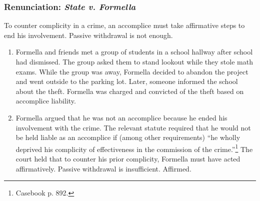 \subsubsection{Renunciation: \emph{State v. Formella}}

To counter complicity in a crime, an accomplice must take affirmative steps to 
end his involvement. Passive withdrawal is not enough.

\begin{enumerate}
    \item Formella and friends met a group of students in a school hallway 
    after school had dismissed. The group asked them to stand lookout while 
    they stole math exams. While the group was away, Formella decided to 
    abandon the project and went outside to the parking lot. Later, someone 
    informed the school about the theft. Formella was charged and convicted of 
    the theft based on accomplice liability.
    \item Formella argued that he was not an accomplice because he ended his 
    involvement with the crime. The relevant statute required that he would 
    not be held liable as an accomplice if (among other requirements) ``he 
    wholly deprived his complicity of effectiveness in the commission of the 
    crime.''\footnote{Casebook p. 892.} The court held that to counter his 
    prior complicity, Formella must have acted affirmatively. Passive 
    withdrawal is insufficient. Affirmed.
\end{enumerate}
